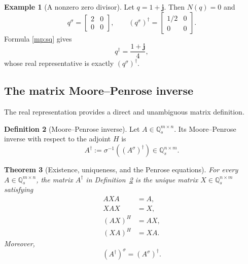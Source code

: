 \documentclass[12pt,a4paper]{article}
\theoremstyle{plain}
\newtheorem{theorem}{Theorem}[section]
\theoremstyle{definition}
\newtheorem{definition}[theorem]{Definition}
\newtheorem{example}[theorem]{Example}
\theoremstyle{remark}
\begin{document}
\begin{example}[A nonzero zero divisor]
Let \(q=1+\mathbf{j}\). Then \(N(q)=0\) and
\[
    q^\sigma=\begin{bmatrix}2&0\\0&0\end{bmatrix}, \qquad (q^\sigma)^\dagger=\begin{bmatrix}1/2&0\\0&0\end{bmatrix}.
\]
Formula \eqref{mp:sq} gives
\[
    q^\dagger=\frac{1+\mathbf{j}}{4},
\]
whose real representative is exactly \((q^\sigma)^\dagger\).
\end{example}

\subsection{The matrix Moore--Penrose inverse}
The real representation provides a direct and unambiguous matrix definition.

\begin{definition}[Moore--Penrose inverse]
\label{def:matrix_mp}
Let \(A\in\mathbb{Q}_s^{m\times n}\). Its Moore--Penrose inverse with respect to the adjoint \(H\) is
\begin{equation} \label{eq:matrix_mp_definition}
    A^\dagger :=\sigma^{-1}\!\left((A^\sigma)^\dagger\right) \in\mathbb{Q}_s^{n\times m}.
\end{equation}
\end{definition}

\begin{theorem}[Existence, uniqueness, and the Penrose equations] \label{lem_mp_em}
For every \(A\in\mathbb{Q}_s^{m\times n}\), the matrix \(A^\dagger\) in Definition~\ref{def:matrix_mp} is the unique matrix \(X\in\mathbb{Q}_s^{n\times m}\) satisfying
\begin{align}
    AXA&=A,\label{eq:matrix_P1}\\
    XAX&=X,\label{eq:matrix_P2}\\
    (AX)^H&=AX,\label{eq:matrix_P3}\\
    (XA)^H&=XA.\label{eq:matrix_P4}
\end{align}
Moreover,
\begin{equation} \label{eq:mp_commutes_sigma}
    (A^\dagger)^\sigma=(A^\sigma)^\dagger.
\end{equation}
\end{theorem}
\end{document}
